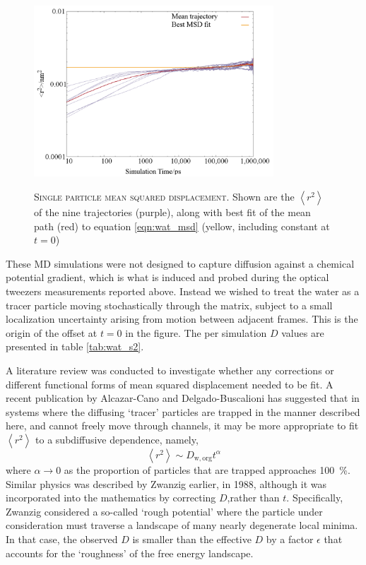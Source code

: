 \begin{figure}
    \centering
    \caption[Single particle mean squared displacement]{\textsc{Single particle mean squared displacement}. Shown are the $\left\langle r^{2}\right\rangle$ of the nine trajectories (purple), along with best fit of the mean path (red) to equation \ref{eqn:wat_msd} (yellow, including constant at $t=0$)}
    \includegraphics[width=0.8\textwidth]{chapters/water_hopping/figures/Fig_S7.png}
    \label{fig:wat_s7}
\end{figure}

These MD simulations were not designed to capture diffusion against a chemical potential gradient, which is what is induced and probed during the optical tweezers measurements reported above. Instead we wished to treat the water as a tracer particle moving stochastically through the matrix, subject to a small localization uncertainty arising from motion between adjacent frames\cite{michaletMeanSquareDisplacement2010}. This is the origin of the offset at $t=0$ in the figure. The per simulation $D$ values are presented in table \ref{tab:wat_s2}. 

A literature review was conducted to investigate whether any corrections or different functional forms of mean squared displacement needed to be fit. A recent publication\cite{alcazar-canoGeneralPhenomenologicalRelation2018} by Alcazar-Cano and Delgado-Buscalioni has suggested that in systems where the diffusing `tracer’ particles are trapped in the manner described here, and cannot freely move through channels, it may be more appropriate to fit $\left\langle r^{2}\right\rangle$ to a subdiffusive dependence, namely, 
\begin{equation}
\left\langle r^{2}\right\rangle \sim D_{\mathrm{w, org}} t^{\alpha}
\end{equation}
where $\alpha \rightarrow 0$ as the proportion of particles that are trapped approaches \SI{100}{\percent}. Similar physics was described by Zwanzig\cite{zwanzigDiffusionRoughPotential1988} earlier, in 1988, although it was incorporated into the mathematics by correcting $D$,rather than $t$. Specifically, Zwanzig considered a so-called `rough potential' where the particle under consideration must traverse a landscape of many nearly degenerate local minima. In that case, the observed $D$ is smaller than the effective $D$ by a factor $\epsilon$ that accounts for the `roughness' of the free energy landscape.

